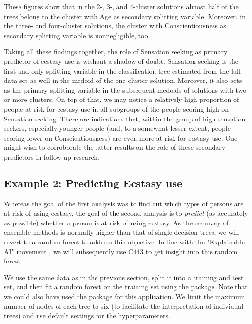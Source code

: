 These figures show that in the 2-, 3-, and  4-cluster solutions almost half of the trees belong to the cluster with Age as secondary splitting variable. Moreover, in the three- and four-cluster solutions, the cluster with Conscientiousness as secondary splitting variable is nonnegligible, too.

Taking all these findings together, the role of Sensation seeking as primary predictor of ecstasy use is without a shadow of doubt. Sensation seeking is the first and only splitting variable in the classification tree estimated from the full data set as well in the medoid of the one-cluster solution. Moreover, it also acts as the primary splitting variable in the subsequent medoids of solutions with two or more clusters. On top of that, we may notice a relatively high proportion of people at risk for ecstasy use in all subgroups of the people scoring high on Sensation seeking. There are indications that, within the group of high sensation seekers, especially younger people (and, to a somewhat lesser extent, people scoring lower on Conscientiousness) are even more at risk for ecstasy use. One might wish to corroborate the latter results on the role of these secondary predictors in follow-up research.


\subsection{Example 2: Predicting Ecstasy use}\label{sec:illustration2}
Whereas the goal of the first analysis was to find out which types of persons are at risk of using ecstasy, the goal of the second analysis is to \textit{predict} (as accurately as possible) whether a person is at risk of using ecstasy. As the accuracy of ensemble methods is normally higher than that of single decision trees, we will revert to a random forest to address this objective. In line with the "Explainable AI" movement \citep{Arrieta2020}, we will subsequently use C443 to get insight into this random forest. 

We use the same data as in the previous section, split it into a training and test set, and then fit a random forest on the training set using the  package. Note that we could also have used the  package for this application. We limit the maximum number of nodes of each tree to six (to facilitate the interpretation of individual trees) and use default settings for the hyperparameters.

